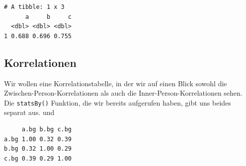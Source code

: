 \documentclass[
  letterpaper,
  DIV=11,
  numbers=noendperiod]{scrreprt}
\newenvironment{Shaded}{\begin{snugshade}}{\end{snugshade}}
\newcommand{\AttributeTok}[1]{\textcolor[rgb]{0.40,0.45,0.13}{#1}}
\newcommand{\CommentTok}[1]{\textcolor[rgb]{0.37,0.37,0.37}{#1}}
\newcommand{\ConstantTok}[1]{\textcolor[rgb]{0.56,0.35,0.01}{#1}}
\newcommand{\DecValTok}[1]{\textcolor[rgb]{0.68,0.00,0.00}{#1}}
\newcommand{\FunctionTok}[1]{\textcolor[rgb]{0.28,0.35,0.67}{#1}}
\newcommand{\NormalTok}[1]{\textcolor[rgb]{0.00,0.23,0.31}{#1}}
\newcommand{\OtherTok}[1]{\textcolor[rgb]{0.00,0.23,0.31}{#1}}
\newcommand{\SpecialCharTok}[1]{\textcolor[rgb]{0.37,0.37,0.37}{#1}}
\begin{document}
\begin{Shaded}
\end{Shaded}

\begin{verbatim}
# A tibble: 1 x 3
      a     b     c
  <dbl> <dbl> <dbl>
1 0.688 0.696 0.755
\end{verbatim}

\subsection{Korrelationen}\label{korrelationen}

Wir wollen eine Korrelationstabelle, in der wir auf einen Blick sowohl
die Zwischen-Person-Korrelationen als auch die
Inner-Person-Korrelationen sehen. Die \texttt{statsBy()} Funktion, die
wir bereits aufgerufen haben, gibt uns beides separat aus. und

\begin{Shaded}
\end{Shaded}

\begin{verbatim}
     a.bg b.bg c.bg
a.bg 1.00 0.32 0.39
b.bg 0.32 1.00 0.29
c.bg 0.39 0.29 1.00
\end{verbatim}

\begin{Shaded}
\end{Shaded}
\end{document}
